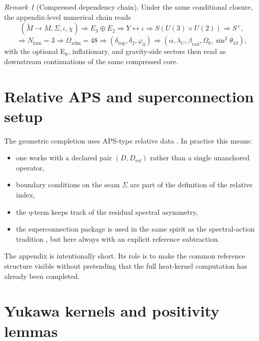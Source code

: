 \documentclass[11pt,a4paper]{article}
\theoremstyle{definition}
\theoremstyle{remark}
\newtheorem*{remark}{Remark}
\newcommand{\Seam}{\Sigma}
\newcommand{\inv}{\iota}
\newcommand{\phiz}{\varphi_0}
\newcommand{\deltatop}{\delta_{\mathrm{top}}}
\newcommand{\Oadm}{\Omega_{\mathrm{adm}}}
\begin{document}
\begin{remark}[Compressed dependency chain]
Under the same conditional closure, the appendix-level numerical chain reads
\[
(\widetilde M\to M,\Seam,\inv,\chi)
\Longrightarrow
E_3\oplus E_2
\Longrightarrow
Y \leftrightarrow \inv
\Longrightarrow
S(U(3)\times U(2))
\Longrightarrow
S^+,
\]
\[
\Longrightarrow
N_{\mathrm{fam}}=3
\Longrightarrow
\Oadm=48
\Longrightarrow
(\deltatop,\delta_2,\phiz)
\Longrightarrow
(\alpha,\lambda_C,\beta_{\mathrm{rad}},\Omega_b,\sin^2\theta_{13}),
\]
with the optional E$_8$, inflationary, and gravity-side sectors then read as downstream continuations of the same compressed core.
\end{remark}

\section{Relative APS and superconnection setup}
\label{app:aps}

The geometric completion uses APS-type relative data \cite{aps1975}. In practice this means:
\begin{itemize}[leftmargin=1.5em, topsep=3pt, itemsep=2pt]
    \item one works with a declared pair $(D,D_{\mathrm{ref}})$ rather than a single unanchored operator,
    \item boundary conditions on the seam $\Seam$ are part of the definition of the relative index,
    \item the $\eta$-term keeps track of the residual spectral asymmetry,
    \item the superconnection package is used in the same spirit as the spectral-action tradition \cite{chamseddineConnes1997}, but here always with an explicit reference subtraction.
\end{itemize}

The appendix is intentionally short. Its role is to make the common reference structure visible without pretending that the full heat-kernel computation has already been completed.

\section{Yukawa kernels and positivity lemmas}
\label{app:yukawa}
\end{document}
